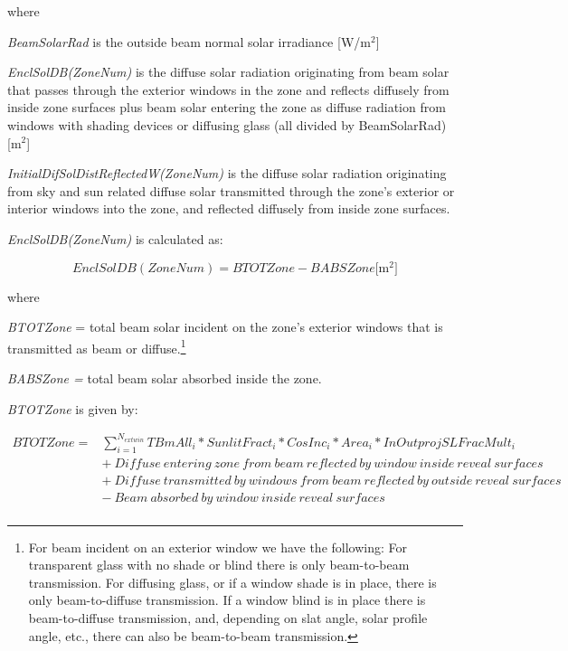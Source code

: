 where

\emph{BeamSolarRad} is the outside beam normal solar irradiance {[}W/m\(^{2}\){]}

\emph{EnclSolDB(ZoneNum)} is the diffuse solar radiation originating from beam solar that passes through the exterior windows in the zone and reflects diffusely from inside zone surfaces plus beam solar entering the zone as diffuse radiation from windows with shading devices or diffusing glass (all divided by BeamSolarRad)~~ {[}m\(^{2}\){]}

\emph{InitialDifSolDistReflectedW(ZoneNum)} is the diffuse solar radiation originating from sky and sun related diffuse solar transmitted through the zone's exterior or interior windows into the zone, and reflected diffusely from inside zone surfaces.

\emph{EnclSolDB(ZoneNum)} is calculated as:

\begin{equation}
EnclSolDB(ZoneNum) = BTOTZone - BABSZone{\mathrm{    [}}{{\mathrm{m}}^{\mathrm{2}}}]
\end{equation}

where

\emph{BTOTZone} = total beam solar incident on the zone's exterior windows that is transmitted as beam or diffuse.\footnote{For beam incident on an exterior window we have the following: For transparent glass with no shade or blind there is only beam-to-beam transmission. For diffusing glass, or if a window shade is in place, there is only beam-to-diffuse transmission. If a window blind is in place there is beam-to-diffuse transmission, and, depending on slat angle, solar profile angle, etc., there can also be beam-to-beam transmission.}

\emph{BABSZone =} total beam solar absorbed inside the zone.

\emph{BTOTZone} is given by:

\begin{equation}
\begin{array}{rl}
BTOTZone = & \sum\limits_{i = 1}^{{N_{extwin}}} {TBmAl{l_i}*SunlitFrac{t_i}*CosIn{c_i}*Are{a_i}*InOutprojSLFracMul{t_i}} \\
           & +~Diffuse~entering~zone~from~beam~reflected~by~window~inside~reveal~surfaces \\
           & +~Diffuse~transmitted~by~windows~from~beam~reflected~by~outside~reveal~surfaces \\
           & -~Beam~absorbed~by~window~inside~reveal~surfaces \\
\end{array}
\end{equation}

